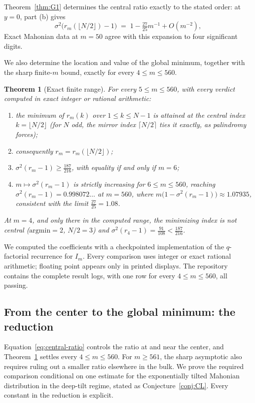 \documentclass[11pt]{amsart}
\theoremstyle{plain}
\newtheorem{theorem}{Theorem}[section]
\theoremstyle{definition}
\theoremstyle{remark}
\begin{document}
Theorem~\ref{thm:G1} determines the central ratio exactly to the stated
order: at $y=0$, part (b) gives
\begin{equation}
\label{eq:central-ratio}
\sigma^2\bigl(r_m(\lfloor N/2\rfloor)-1\bigr) \;=\; 1-\tfrac{27}{25}m^{-1}+O(m^{-2}),
\end{equation}
Exact Mahonian data at $m=50$ agree with this expansion to four significant
digits.

We also determine the location and value of the global minimum, together
with the sharp finite-$m$ bound, exactly for every $4\le m\le560$.

\begin{theorem}[Exact finite range]
\label{thm:finite560}
For every $5\le m\le560$, with every verdict computed in exact integer or
rational arithmetic:
\begin{enumerate}[label=(\roman*)]
\item the minimum of $r_m(k)$ over $1\le k\le N-1$ is attained at the
central index $k=\lfloor N/2\rfloor$ (for $N$ odd, the mirror index
$\lceil N/2\rceil$ ties it exactly, as palindromy forces);
\item consequently $r_m=r_m(\lfloor N/2\rfloor)$;
\item $\sigma^2(r_m-1)\ge\tfrac{187}{216}$, with equality if and only if
$m=6$;
\item $m\mapsto\sigma^2(r_m-1)$ is strictly increasing for $6\le m\le560$,
reaching $\sigma^2(r_m-1)=0.998072\ldots$ at $m=560$, where
$m\bigl(1-\sigma^2(r_m-1)\bigr)\approx1.07935$, consistent with the limit
$\tfrac{27}{25}=1.08$.
\end{enumerate}
At $m=4$, and only there in the computed range, the minimizing index is
not central ($\mathrm{argmin}=2$, $N/2=3$) and
$\sigma^2(r_4-1)=\tfrac{91}{108}<\tfrac{187}{216}$.
\end{theorem}

We computed the coefficients with a checkpointed implementation of the
$q$-factorial recurrence for $I_m$. Every comparison uses integer or exact
rational arithmetic; floating point appears only in printed displays. The
repository contains the complete result logs, with one row for every
$4\le m\le560$, all passing.

\subsection*{From the center to the global minimum: the reduction}
Equation~\eqref{eq:central-ratio} controls the ratio at and near the center,
and Theorem~\ref{thm:finite560} settles every $4\le m\le560$. For
$m\ge561$, the sharp asymptotic also requires ruling out a smaller ratio
elsewhere in the bulk. We prove the required comparison conditional on one
estimate for the exponentially tilted Mahonian distribution in the
deep-tilt regime, stated as Conjecture~\ref{conj:CL}. Every constant in the
reduction is explicit.
\end{document}
